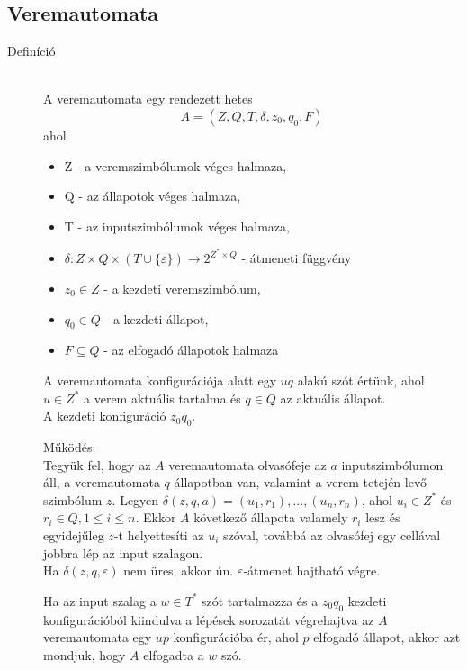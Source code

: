 \documentclass[margin=0px]{article}
\begin{document}
\subsection{Veremautomata}
\begin{description}
    \item[Definíció] \hfill \\
        A veremautomata egy rendezett hetes
        \[A = (Z,Q, T, \delta, z_0, q_0, F)\]
        ahol
        \begin{itemize}
            \item Z - a veremszimbólumok véges halmaza,
            \item Q - az állapotok véges halmaza,
            \item T - az inputszimbólumok véges halmaza,
            \item $\delta : Z \times Q \times (T \cup \{\varepsilon\}) \rightarrow 2^{Z^* \times Q}$ - átmeneti függvény
            \item $z_0 \in Z $ - a kezdeti veremszimbólum,
            \item $q_0 \in Q $ - a kezdeti állapot,
            \item $F \subseteq Q$ - az elfogadó állapotok halmaza
        \end{itemize}

        A veremautomata konfigurációja alatt egy $uq$ alakú szót értünk, ahol $u \in Z^*$ a verem aktuális tartalma és $q \in Q$ az aktuális állapot. \\
        A kezdeti konfiguráció $z_0q_0$.

        Működés: \\
        Tegyük fel, hogy az $A$ veremautomata olvasófeje az $a$ inputszimbólumon áll, a veremautomata $q$ állapotban van, valamint a verem tetején levő szimbólum $z$. Legyen $ \delta(z, q, a) = {(u_1, r_1), . . . , (u_n, r_n)}$, ahol $u_i \in Z^*$ és $r_i \in Q, 1 \leq i \leq n$. Ekkor $A$ következő állapota valamely $r_i$ lesz és egyidejűleg $z$-t helyettesíti az $u_i$ szóval, továbbá az olvasófej egy cellával jobbra lép az input szalagon.\\
        Ha $\delta(z, q, \varepsilon)$ nem üres, akkor ún. $\varepsilon$-átmenet hajtható végre.

        Ha az input szalag a $w \in T^*$ szót tartalmazza és a $z_0q_0$ kezdeti konfigurációból kiindulva a lépések sorozatát végrehajtva az $A$ veremautomata egy $up$ konfigurációba ér, ahol $p$ elfogadó állapot, akkor azt mondjuk, hogy $A$ elfogadta a $w$ szó.


\end{description}
\end{document}

